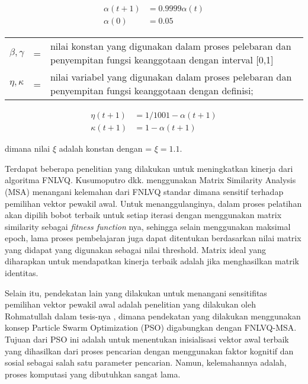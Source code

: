 \begin{small}
	\begin{align}\label{eq:learning_rate}
		\alpha(t+1) &= 0.9999 \alpha(t) \\[0.2cm]
		\alpha(0) &= 0.05 \nonumber
	\end{align}
\end{small}

\begin{tabular}{llp{}}
$\beta, \gamma$ &=& nilai konstan yang digunakan dalam proses pelebaran
dan penyempitan fungsi keanggotaan dengan interval [0,1] \\
$\eta, \kappa$ &=& nilai variabel yang digunakan dalam proses pelebaran
dan penyempitan fungsi keanggotaan dengan definisi;
\end{tabular}

\begin{small}
	\begin{align}\label{eq:fuzziness_value}
	\eta(t+1) &= 1/100 {1-\alpha(t+1)} \\[0.2cm]
	\kappa(t+1) &= 1 - \alpha(t+1) \nonumber
	\end{align}
\end{small}

\noindent dimana nilai $\xi$ adalah konstan dengan = $\xi=1.1$.

Terdapat beberapa penelitian yang dilakukan untuk meningkatkan
kinerja dari algoritma FNLVQ. Kusumoputro dkk. \cite{Kusumoputro:2002b} 
menggunakan Matrix Similarity Analysis (MSA) menangani kelemahan dari FNLVQ
standar dimana sensitif terhadap pemilihan vektor pewakil awal. Untuk
menanggulanginya, dalam proses pelatihan akan dipilih bobot terbaik untuk
setiap iterasi dengan menggunakan matrix similarity sebagai  \emph{fitness
function} nya, sehingga selain menggunakan maksimal epoch, lama proses
pembelajaran juga dapat ditentukan berdasarkan nilai matrix yang didapat 
yang digunakan sebagai nilai threshold. Matrix ideal yang diharapkan untuk 
mendapatkan kinerja terbaik adalah jika menghasilkan matrik identitas.

Selain itu, pendekatan lain yang dilakukan untuk menangani
sensitifitas pemilihan vektor pewakil awal adalah penelitian yang dilakukan oleh
Rohmatullah dalam tesis-nya \cite{Rochmatullah:2009}, dimana pendekatan yang
dilakukan menggunakan konsep Particle Swarm Optimization (PSO) digabungkan
dengan FNLVQ-MSA. Tujuan dari PSO ini adalah untuk menentukan inisialisasi
vektor awal terbaik yang dihasilkan dari proses pencarian dengan menggunakan
faktor kognitif dan sosial sebagai salah satu parameter pencarian. Namun,
kelemahannya adalah, proses komputasi yang dibutuhkan sangat lama.


% 












